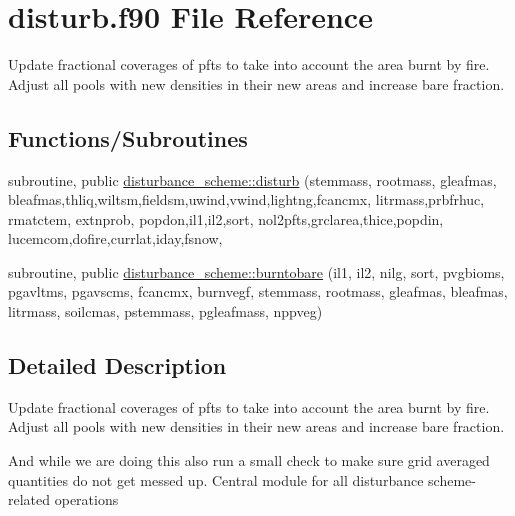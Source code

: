 \hypertarget{disturb_8f90}{}\section{disturb.\+f90 File Reference}
\label{disturb_8f90}


Update fractional coverages of pfts to take into account the area burnt by fire. Adjust all pools with new densities in their new areas and increase bare fraction.  


\subsection*{Functions/\+Subroutines}
{\bf }\par
\begin{DoxyCompactItemize}
\item 
subroutine, public \hyperlink{group__disturbance__scheme__disturb_gae9a0c3412bfa04257e8b3a7475f4cd1d}{disturbance\+\_\+scheme\+::disturb} (stemmass, rootmass, gleafmas, bleafmas,thliq,wiltsm,fieldsm,uwind,vwind,lightng,fcancmx, litrmass,prbfrhuc, rmatctem, extnprob, popdon,il1,il2,sort, nol2pfts,grclarea,thice,popdin, lucemcom,dofire,currlat,iday,fsnow,
\end{DoxyCompactItemize}

{\bf }\par
\begin{DoxyCompactItemize}
\item 
subroutine, public \hyperlink{group__disturbance__scheme__burntobare_gae72fa0c94541c3e88a45d71f2442be9c}{disturbance\+\_\+scheme\+::burntobare} (il1, il2, nilg, sort, pvgbioms, pgavltms, pgavscms, fcancmx, burnvegf, stemmass, rootmass, gleafmas, bleafmas, litrmass, soilcmas, pstemmass, pgleafmass, nppveg)
\end{DoxyCompactItemize}



\subsection{Detailed Description}
Update fractional coverages of pfts to take into account the area burnt by fire. Adjust all pools with new densities in their new areas and increase bare fraction. 

And while we are doing this also run a small check to make sure grid averaged quantities do not get messed up. Central module for all disturbance scheme-\/related operations 